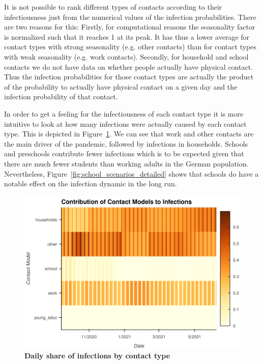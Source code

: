 It is not possible to rank different types of contacts according to their
infectiousness just from the numerical values of the infection probabilities.
There are two reasons for this: Firstly, for computational reasons the
seasonality factor is normalized such that it reaches 1 at its peak. It has thus
a lower average for contact types with strong seasonality (e.g. other contacts) than for
contact types with weak seasonality (e.g. work contacts). Secondly, for household and
school contacts we do not have data on whether people actually have physical contact.
Thus the infection probabilities for those contact types are actually the product of the
probability to actually have physical contact on a given day and the infection
probability of that contact.

In order to get a feeling for the infectiousness of each contact type it
is more intuitive to look at how many infections were actually caused by each contact
type. This is depicted in Figure~\ref{fig:infection_heatmap}. We can see that work and
other contacts are the main driver of the pandemic, followed by infections in
households. Schools and preschools contribute fewer infections which is to be expected
given that there are much fewer students than working adults in the German population.
Nevertheless, Figure~\ref{fig:school_scenarios_detailed} shows that schools do have a
notable effect on the infection dynamic in the long run.

\begin{figure}
    \centering
    \includegraphics[width=\textwidth]{figures/infection_channels.png}
    \caption{\textbf{Daily share of infections by contact type}}
    \label{fig:infection_heatmap}
\end{figure}

